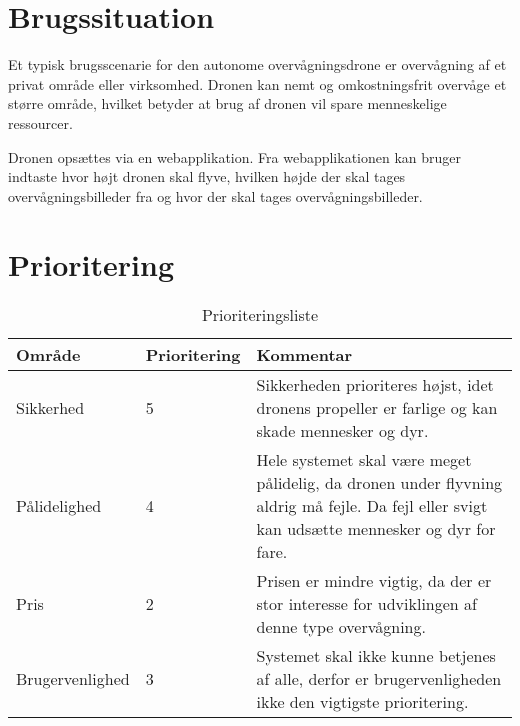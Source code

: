 \section{Brugssituation}

Et typisk brugsscenarie for den autonome overvågningsdrone er overvågning af et privat område eller virksomhed. Dronen kan nemt og omkostningsfrit overvåge et større område, hvilket betyder at brug af dronen vil spare menneskelige ressourcer. 

Dronen opsættes via en webapplikation. Fra webapplikationen kan bruger indtaste hvor højt dronen skal flyve, hvilken højde der skal tages overvågningsbilleder fra og hvor der skal tages overvågningsbilleder.



\section{Prioritering}

\begin{table}[H]
	\centering
		\begin{tabular}{|l|l|p{9 cm}|} 
		\hline
			Område & Prioritering & Kommentar \\ \hline
			Sikkerhed 		& 5 	& Sikkerheden prioriteres højst, idet dronens propeller er farlige og kan skade mennesker og dyr.   \\ \hline
			
			Pålidelighed 	& 4 	& Hele systemet skal være meget pålidelig, da dronen under flyvning aldrig må fejle. Da fejl eller svigt kan udsætte mennesker og dyr for fare.  \\ \hline
			
			Pris 			& 2 	& Prisen er mindre vigtig, da der er stor interesse for udviklingen af denne type overvågning.    \\ \hline
			
			Brugervenlighed & 3 	& Systemet skal ikke kunne betjenes af alle, derfor er brugervenligheden ikke den vigtigste prioritering. \\ \hline
		\end{tabular}
	\caption{Prioriteringsliste}
\end{table}
